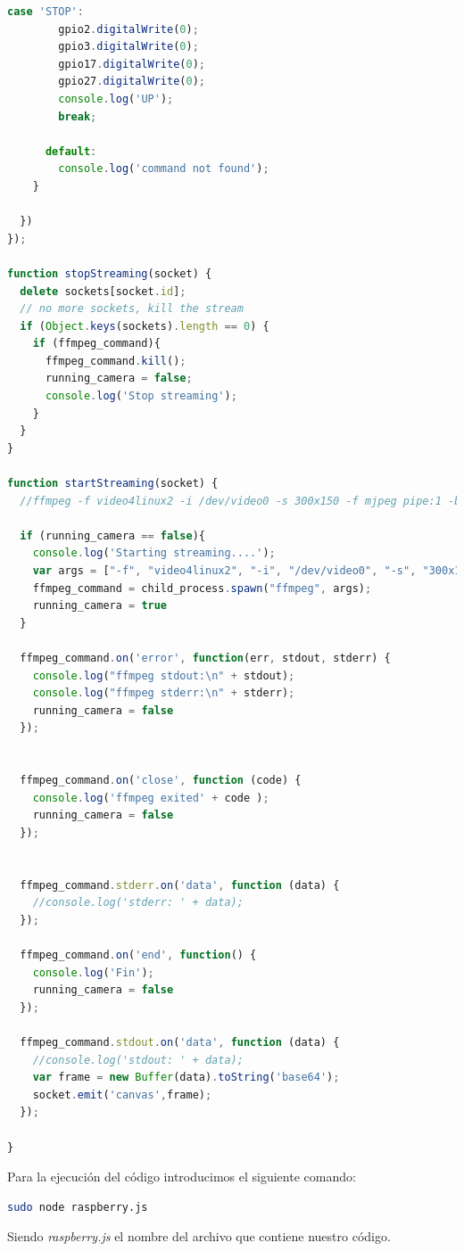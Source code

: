 \begin{lstlisting}[language=JavaScript]
      case 'STOP':
        gpio2.digitalWrite(0);
        gpio3.digitalWrite(0);
        gpio17.digitalWrite(0);
        gpio27.digitalWrite(0);
        console.log('UP');
        break;

      default:
        console.log('command not found');
    }

  })
});

function stopStreaming(socket) {
  delete sockets[socket.id];
  // no more sockets, kill the stream
  if (Object.keys(sockets).length == 0) {
    if (ffmpeg_command){
      ffmpeg_command.kill();
      running_camera = false;
      console.log('Stop streaming');
    }
  }
}

function startStreaming(socket) {
  //ffmpeg -f video4linux2 -i /dev/video0 -s 300x150 -f mjpeg pipe:1 -b:v 28k -bufsize 28k

  if (running_camera == false){
    console.log('Starting streaming....');
    var args = ["-f", "video4linux2", "-i", "/dev/video0", "-s", "300x150","-f","mjpeg", "pipe:1", "-b:v 28k", "-bufsize 28k"]
    ffmpeg_command = child_process.spawn("ffmpeg", args);
    running_camera = true
  }

  ffmpeg_command.on('error', function(err, stdout, stderr) {
    console.log("ffmpeg stdout:\n" + stdout);
    console.log("ffmpeg stderr:\n" + stderr);
    running_camera = false
  });


  ffmpeg_command.on('close', function (code) {
    console.log('ffmpeg exited' + code );
    running_camera = false
  });


  ffmpeg_command.stderr.on('data', function (data) {
    //console.log('stderr: ' + data);
  });

  ffmpeg_command.on('end', function() {
    console.log('Fin');
    running_camera = false
  });

  ffmpeg_command.stdout.on('data', function (data) {
    //console.log('stdout: ' + data);
    var frame = new Buffer(data).toString('base64');
    socket.emit('canvas',frame);
  });

}

\end{lstlisting}


Para la ejecución del código introducimos el siguiente comando:

\begin{lstlisting}[language=bash]
  sudo node raspberry.js
\end{lstlisting}

Siendo \emph{raspberry.js} el nombre del archivo que contiene nuestro código.
